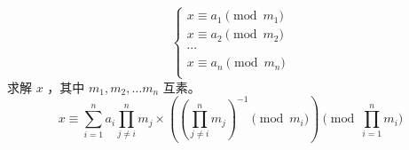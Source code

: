 $$
\begin{cases}
	x\equiv a_1 \pmod {m_1}\\
	x\equiv a_2 \pmod {m_2}\\
	\cdots\\
	x\equiv a_n \pmod {m_n}\\
\end{cases}
$$
求解 $x$ ，其中 $m_1,m_2,\dots m_n$ 互素。
$$
x\equiv\sum_{i=1}^na_i\prod_{j\neq i}^n m_j\times\left(\left(\prod_{j\neq i}^n m_j\right)^{-1}\pmod{m_i}\right)\pmod{\prod_{i=1}^n m_i}
$$